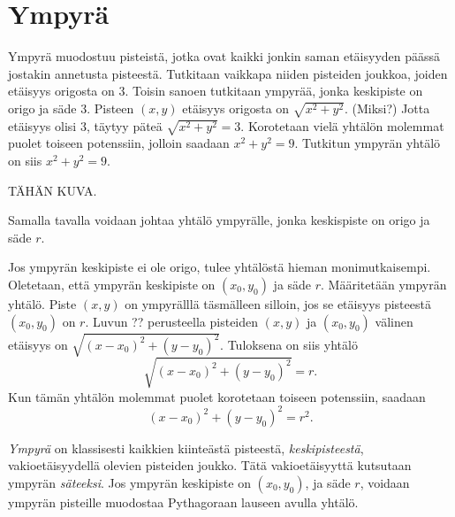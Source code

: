 \section{Ympyrä}


Ympyrä muodostuu pisteistä, jotka ovat kaikki jonkin saman etäisyyden päässä jostakin annetusta pisteestä. Tutkitaan vaikkapa niiden pisteiden joukkoa, joiden etäisyys origosta on 3. Toisin sanoen tutkitaan ympyrää, jonka keskipiste on origo ja säde 3. Pisteen $(x,y)$ etäisyys origosta on $\sqrt{x^2+y^2}$. (Miksi?) Jotta etäisyys olisi 3, täytyy päteä $\sqrt{x^2+y^2}=3$. Korotetaan vielä yhtälön molemmat puolet toiseen potenssiin, jolloin saadaan $x^2+y^2=9$. Tutkitun ympyrän yhtälö on siis $x^2+y^2=9$.

TÄHÄN KUVA.

Samalla tavalla voidaan johtaa yhtälö ympyrälle, jonka keskispiste on origo ja säde $r$.

Jos ympyrän keskipiste ei ole origo, tulee yhtälöstä hieman monimutkaisempi. Oletetaan, että ympyrän keskipiste on $(x_0,y_0)$ ja säde $r$. Määritetään ympyrän yhtälö. Piste $(x,y)$ on ympyrälllä täsmälleen silloin, jos se etäisyys pisteestä $(x_0,y_0)$ on $r$. Luvun ?? perusteella pisteiden $(x,y)$ ja $(x_0,y_0)$ välinen etäisyys on $\sqrt{(x-x_0)^2+(y-y_0)^2}$. Tuloksena on siis yhtälö
\[
\sqrt{(x-x_0)^2+(y-y_0)^2}=r.
\]
Kun tämän yhtälön molemmat puolet korotetaan toiseen potenssiin, saadaan
\[
(x-x_0)^2+(y-y_0)^2=r^2.
\]


\emph{Ympyrä} on klassisesti kaikkien kiinteästä pisteestä, \emph{keskipisteestä}, vakioetäisyydellä olevien pisteiden joukko. Tätä vakioetäisyyttä kutsutaan ympyrän \emph{säteeksi}. Jos ympyrän keskipiste on $(x_{0},y_{0})$, ja säde $r$, voidaan ympyrän pisteille muodostaa Pythagoraan lauseen avulla yhtälö.

